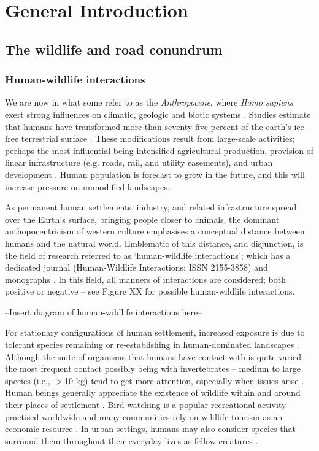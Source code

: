 \chapter{General Introduction}\label{sec:intro}
\newpage

\section{The wildlife and road conundrum}

\subsection{Human-wildlife interactions}

We are now in what some refer to as the \textit{Anthropocene}, where \textit{Homo sapiens} exert strong influences on climatic, geologic and biotic systems \citep{crut06}. Studies estimate that humans have transformed more than seventy-five percent of the earth's ice-free terrestrial surface \citep[e.g.][]{elli08}. These modifications result from large-scale activities; perhaps the most influential being intensified agricultural production, provision of linear infrastructure (e.g. roads, rail, and utility easements), and urban development \citep{vito97,sand02,fole05}. Human population is forecast to grow in the future, and this will increase pressure on unmodified landscapes.

As permanent human settlements, industry, and related infrastructure spread over the Earth’s surface, bringing people closer to animals, the dominant anthopocentricism of western culture emphasises a conceptual distance between humans and the natural world.  Emblematic of this distance, and disjunction, is the field of research referred to as `human-wildlife interactions'; which has a dedicated journal (Human-Wildlife Interactions: ISSN 2155-3858) and monographs \citep[e.g.][]{manf08}. In this field, all manners of interactions are considered; both positive \citep{dall12} or negative \citep{jone99} -- see Figure XX for possible human-wildlife interactions. 

\begin{center}
--Insert diagram of human-wildlife interactions here--
\end{center}

For stationary configurations of human settlement, increased exposure is due to tolerant species remaining or re-establishing in human-dominated landscapes \citep{soul16}. Although the suite of organisms that humans have contact with is quite varied -- the most frequent contact possibly being with invertebrates -- medium to large species (i.e., $>$10 kg) tend to get more attention, especially when issues arise \citep{seor16}. Human beings generally appreciate the existence of wildlife within and around their places of settlement \citep{dick86,kell93,raad07}. Bird watching is a popular recreational activity practised worldwide and many communities rely on wildlife tourism as an economic resource \citep{news05}. In urban settings, humans may also consider species that surround them throughout their everyday lives as fellow-creatures \citep{zinn08}.


